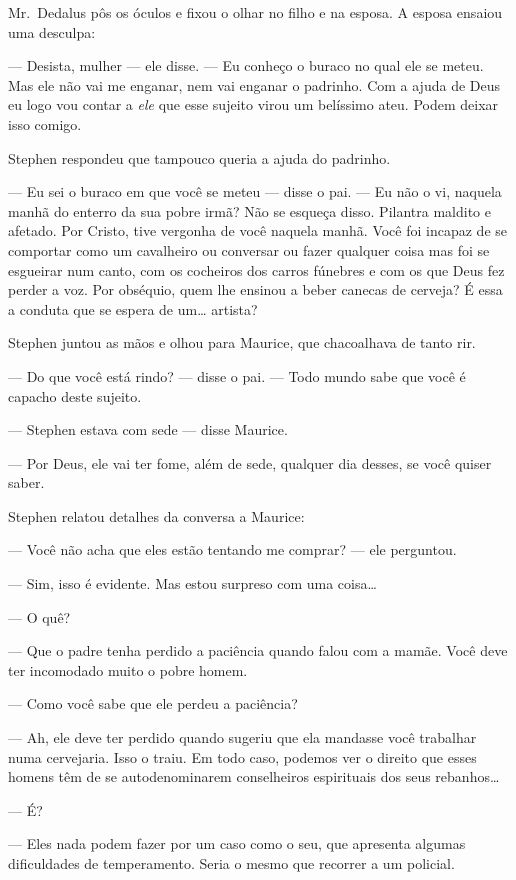 Mr.~Dedalus pôs os óculos e fixou o olhar no filho e na esposa.  A
esposa ensaiou uma desculpa:

--- Desista, mulher --- ele disse.  --- Eu conheço o buraco no qual
ele se meteu.  Mas ele não vai me enganar, nem vai enganar o padrinho. 
Com a ajuda de Deus eu logo vou contar a \textit{ele} que esse sujeito		
virou um belíssimo ateu.  Podem deixar isso comigo.

Stephen respondeu que tampouco queria a ajuda do padrinho.

--- Eu sei o buraco em que você se meteu --- disse o pai.  --- Eu não
o vi, naquela manhã do enterro da sua pobre irmã?  Não se esqueça
disso.  Pilantra maldito e afetado.  Por Cristo, tive vergonha de você
naquela manhã.  Você foi incapaz de se comportar como um \label{cavalheiro} cavalheiro
ou conversar ou fazer qualquer coisa mas foi se esgueirar num canto,
com os cocheiros dos carros fúnebres e com os que Deus fez perder a
voz.  Por obséquio, quem lhe ensinou a beber canecas de cerveja?  É
essa a conduta que se espera de um\ldots{} artista?

Stephen juntou as mãos e olhou para Maurice, que chacoalhava de
tanto rir.

--- Do que você está rindo? --- disse o pai.  --- Todo mundo sabe que
você é capacho deste sujeito.

--- Stephen estava com sede --- disse Maurice.

--- Por Deus, ele vai ter fome, além de sede, qualquer dia
desses, se você quiser saber.

Stephen relatou detalhes da conversa a Maurice:

--- Você não acha que eles estão tentando me comprar? --- ele
perguntou.

--- Sim, isso é evidente.  Mas estou surpreso com uma coisa\ldots{}

--- O quê?

--- Que o padre tenha perdido a paciência quando falou com a
mamãe.  Você deve ter incomodado muito o pobre homem.

--- Como você sabe que ele perdeu a paciência?

--- Ah, ele deve ter perdido quando sugeriu que ela mandasse você
trabalhar numa cervejaria.  Isso o traiu.  Em todo caso, podemos ver o
direito que esses homens têm de se autodenominarem conselheiros
espirituais dos seus rebanhos\ldots{}

--- É?

--- Eles nada podem fazer por um caso como o seu, que apresenta
algumas dificuldades de temperamento.  Seria o mesmo que recorrer a um
policial.

